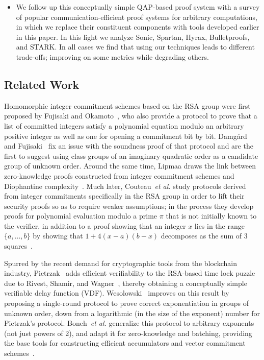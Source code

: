 \documentclass{article}
\theoremstyle{definition}
\newcommand{\alan}[1]{{\todo[color=blue!40!white]{Alan: #1}}}
\newcommand{\alan}[1]{}
\begin{document}
\begin{itemize}
    \item[] \alan{deprecated} We follow up this conceptually simple QAP-based proof system with a survey of popular communication-efficient proof systems for arbitrary computations, in which we replace their constituent components with tools developed earlier in this paper. In this light we analyze Sonic, Spartan, Hyrax, Bulletproofs, and STARK. In all cases we find that using our techniques leads to different trade-offs; improving on some metrics while degrading others.
\end{itemize}

\subsection{Related Work}

Homomorphic integer commitment schemes based on the RSA group were first proposed by Fujisaki and Okamoto~\cite{C:FujOka97}, who also provide a protocol to prove that a list of committed integers satisfy a polynomial equation modulo an arbitrary positive integer as well as one for opening a commitment bit by bit. Damgård and Fujisaki~\cite{AC:DamFuj02} fix an issue with the soundness proof of that protocol and are the first to suggest using class groups of an imaginary quadratic order as a candidate group of unknown order. Around the same time, Lipmaa draws the link between zero-knowledge proofs constructed from integer commitment schemes and Diophantine complexity~\cite{AC:Lipmaa03b}. Much later, Couteau~\emph{et al.} study protocols derived from integer commitments specifically in the RSA group in order to lift their security proofs so as to require weaker assumptions; in the process they develop proofs for polynomial evaluation modulo a prime $\pi$ that is not initially known to the verifier, in addition to a proof showing that an integer $x$ lies in the range $\{a, \ldots, b\}$ by showing that $1+4(x-a)(b-x)$ decomposes as the sum of 3 squares~\cite{EC:CouPetPoi17}.

Spurred by the recent demand for cryptographic tools from the blockchain industry, Pietrzak~\cite{Pietrzak18} adds efficient verifiability to the RSA-based time lock puzzle due to Rivest, Shamir, and Wagner~\cite{RivShaWag96}, thereby obtaining a conceptually simple verifiable delay function (VDF). Wesolowski~\cite{EC:Wesolowski19} improves on this result by proposing a single-round protocol to prove correct exponentiation in groups of unknown order, down from a logarithmic (in the size of the exponent) number for Pietrzak's protocol. Boneh~\emph{et al.} generalize this protocol to arbitrary exponents (not just powers of 2), and adapt it for zero-knowledge and batching, providing the base tools for constructing efficient accumulators and vector commitment schemes~\cite{C:BonBunFis19}.
\end{document}
